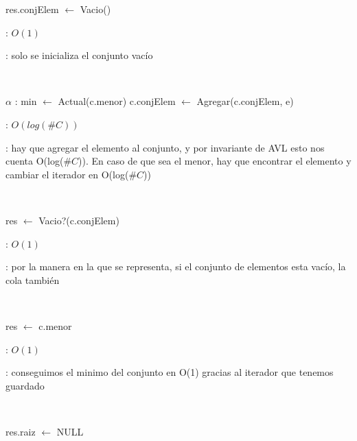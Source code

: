 \begin{Algoritmos}

	\begin{algorithm}[H]
		\NoCaptionOfAlgo
		\caption{}
		res.conjElem $\leftarrow$ Vacio()
	\end{algorithm}

	\complejidad: $O(1)$

	\justifcomp: solo se inicializa el conjunto vacío

	~

	\begin{algorithm}[H]
		\NoCaptionOfAlgo
		\caption{}
		$\alpha$ : min $\leftarrow$ Actual(c.menor)
		c.conjElem $\leftarrow$ Agregar(c.conjElem, e)
	\end{algorithm}

	\complejidad: $O(log(\#C))$

	\justifcomp: hay que agregar el elemento al conjunto, y por invariante de AVL esto nos cuenta O(log($\#C$)). En caso de que sea el menor, hay que encontrar el elemento y cambiar el iterador en O(log($\#C$))

	~

	\begin{algorithm}[H]
		\NoCaptionOfAlgo
		\caption{}
		res $\leftarrow$ Vacio?(c.conjElem)
	\end{algorithm}

	\complejidad: $O(1)$

	\justifcomp: por la manera en la que se representa, si el conjunto de elementos esta vacío, la cola también

	~

	\begin{algorithm}[H]
		\NoCaptionOfAlgo
		\caption{}
		res $\leftarrow$ c.menor
	\end{algorithm}

	\complejidad: $O(1)$

	\justifcomp: conseguimos el minimo del conjunto en O(1) gracias al iterador que tenemos guardado

	~

	\begin{algorithm}[H]
		\NoCaptionOfAlgo
		\caption{}
		res.raiz $\leftarrow$ NULL
	\end{algorithm}


\end{Algoritmos}
